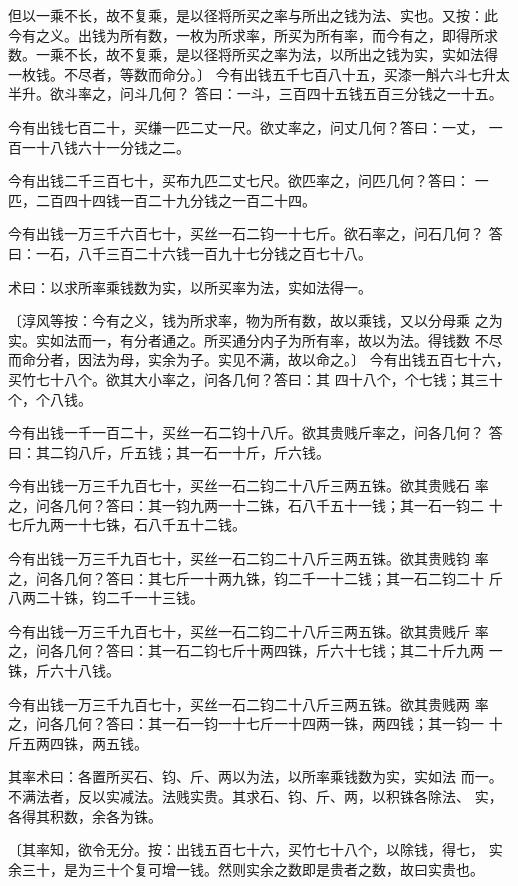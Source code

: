 \documentclass[a4paper,12pt,UTF8,twoside]{ctexbook}
\begin{document}
但以一乘不长，故不复乘，是以径将所买之率与所出之钱为法、实也。又按：此 今有之义。出钱为所有数，一枚为所求率，所买为所有率，而今有之，即得所求 数。一乘不长，故不复乘，是以径将所买之率为法，以所出之钱为实，实如法得 一枚钱。不尽者，等数而命分。〕 今有出钱五千七百八十五，买漆一斛六斗七升太半升。欲斗率之，问斗几何？ 答曰：一斗，三百四十五钱五百三分钱之一十五。

今有出钱七百二十，买缣一匹二丈一尺。欲丈率之，问丈几何？答曰：一丈， 一百一十八钱六十一分钱之二。

今有出钱二千三百七十，买布九匹二丈七尺。欲匹率之，问匹几何？答曰： 一匹，二百四十四钱一百二十九分钱之一百二十四。

今有出钱一万三千六百七十，买丝一石二钧一十七斤。欲石率之，问石几何？ 答曰：一石，八千三百二十六钱一百九十七分钱之百七十八。

术曰：以求所率乘钱数为实，以所买率为法，实如法得一。

〔淳风等按：今有之义，钱为所求率，物为所有数，故以乘钱，又以分母乘 之为实。实如法而一，有分者通之。所买通分内子为所有率，故以为法。得钱数 不尽而命分者，因法为母，实余为子。实见不满，故以命之。〕 今有出钱五百七十六，买竹七十八个。欲其大小率之，问各几何？答曰：其 四十八个，个七钱；其三十个，个八钱。

今有出钱一千一百二十，买丝一石二钧十八斤。欲其贵贱斤率之，问各几何？ 答曰：其二钧八斤，斤五钱；其一石一十斤，斤六钱。

今有出钱一万三千九百七十，买丝一石二钧二十八斤三两五铢。欲其贵贱石 率之，问各几何？答曰：其一钧九两一十二铢，石八千五十一钱；其一石一钧二 十七斤九两一十七铢，石八千五十二钱。

今有出钱一万三千九百七十，买丝一石二钧二十八斤三两五铢。欲其贵贱钧 率之，问各几何？答曰：其七斤一十两九铢，钧二千一十二钱；其一石二钧二十 斤八两二十铢，钧二千一十三钱。

今有出钱一万三千九百七十，买丝一石二钧二十八斤三两五铢。欲其贵贱斤 率之，问各几何？答曰：其一石二钧七斤十两四铢，斤六十七钱；其二十斤九两 一铢，斤六十八钱。

今有出钱一万三千九百七十，买丝一石二钧二十八斤三两五铢。欲其贵贱两 率之，问各几何？答曰：其一石一钧一十七斤一十四两一铢，两四钱；其一钧一 十斤五两四铢，两五钱。

其率术曰：各置所买石、钧、斤、两以为法，以所率乘钱数为实，实如法 而一。不满法者，反以实减法。法贱实贵。其求石、钧、斤、两，以积铢各除法、 实，各得其积数，余各为铢。

〔其率知，欲令无分。按：出钱五百七十六，买竹七十八个，以除钱，得七， 实余三十，是为三十个复可增一钱。然则实余之数即是贵者之数，故曰实贵也。
\end{document}
